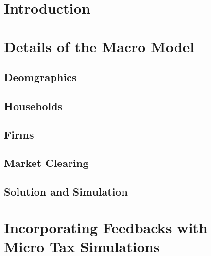 \documentclass[letterpaper,12pt]{article}
\theoremstyle{definition}
\numberwithin{equation}{section}
\begin{document}
\begin{spacing}{1.5}


\section{Introduction}\label{Sec_Intro}

\section{Details of the Macro Model}\label{Sec_Macro}

  \subsection{Deomgraphics}

  \subsection{Households}

  \subsection{Firms}

  \subsection{Market Clearing}

  \subsection{Solution and Simulation}
    

\newpage

\section{Incorporating Feedbacks with Micro Tax Simulations}\label{SecMicro}


\end{spacing}
\end{document}
